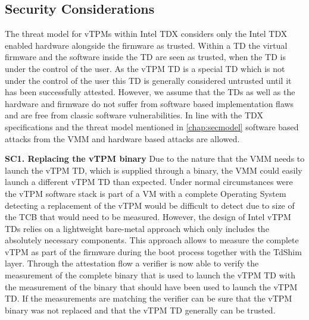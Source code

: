 \documentclass[sigplan,screen,nonacm]{acmart}
\begin{document}
\subsection{Security Considerations}
The threat model for vTPMs within Intel TDX considers only the Intel TDX enabled hardware alongside the firmware as trusted.
Within a TD the virtual firmware and the software inside the TD are seen as trusted, when the TD is under the control of the user.
As the vTPM TD is a special TD which is not under the control of the user this TD is generally considered untrusted until it has been successfully attested.
However, we assume that the TDs as well as the hardware and firmware do not suffer from software based implementation flaws and are free from classic software vulnerabilities.
In line with the TDX specifications and the threat model mentioned in \cref{chap:secmodel} software based attacks from the VMM and hardware based attacks are allowed.

\textbf{SC1. Replacing the vTPM binary}
Due to the nature that the VMM needs to launch the vTPM TD, which is supplied through a binary, the VMM could easily launch a different vTPM TD than expected\cite[p. 84]{Intel-linux-tdx}\cite{libvirt}.
Under normal circumstances were the vTPM software stack is part of a VM with a complete Operating System detecting a replacement of the vTPM would be difficult to detect due to size of the TCB that would need to be measured.
However, the design of Intel vTPM TDs relies on a lightweight bare-metal approach which only includes the absolutely necessary components\cite[p. 18]{Intel-vTPM}.
This approach allows to measure the complete vTPM as part of the firmware during the boot process together with the TdShim layer\cite[p. 19]{Intel-vTPM}.
Through the attestation flow a verifier is now able to verify the measurement of the complete binary that is used to launch the vTPM TD with the measurement of the binary that should have been used to launch the vTPM TD.
If the measurements are matching the verifier can be sure that the vTPM binary was not replaced and that the vTPM TD generally can be trusted.
\end{document}
